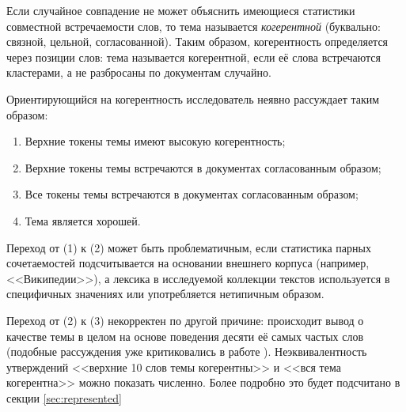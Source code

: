 Если случайное совпадение не может объяснить имеющиеся статистики совместной встречаемости слов, то тема называется \textit{когерентной} (буквально: связной, цельной, согласованной). Таким образом, когерентность определяется через позиции слов: тема называется когерентной, если её слова встречаются кластерами, а не разбросаны по документам случайно.

Ориентирующийся на когерентность исследователь неявно рассуждает таким образом:
\begin{enumerate}
    \item Верхние токены темы имеют высокую когерентность;
    \item Верхние токены темы встречаются в документах согласованным образом;
    \item Все токены темы встречаются в документах согласованным образом;
    \item Тема является хорошей.
\end{enumerate}

Переход от (1) к (2) может быть проблематичным, если статистика парных сочетаемостей подсчитывается на основании внешнего корпуса (например, <<Википедии>>), а лексика в исследуемой коллекции текстов используется в специфичных значениях или употребляется нетипичным образом.

Переход от (2) к (3) некорректен по другой причине: происходит вывод о качестве темы в целом на основе поведения десяти её самых частых слов (подобные рассуждения уже критиковались в работе  \cite{dh_sea}). Неэквивалентность утверждений <<верхние 10 слов темы когерентны>> и <<вся тема когерентна>> можно показать численно. Более подробно это будет подсчитано в секции \ref{sec:represented}





